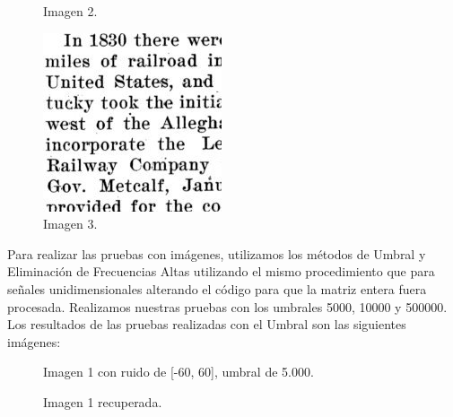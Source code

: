 \documentclass[10pt, a4paper]{article}
\begin{document}
\begin{itemize}
\begin{figure}[!htb]
  \caption{Imagen 2.}\label{fig:awesome_image2}
\endminipage\hfill
{}%
  \includegraphics[width=\linewidth]{imagen3.jpg}
  \caption{Imagen 3.}\label{fig:awesome_image3}
\endminipage
\end{figure}


Para realizar las pruebas con imágenes, utilizamos los métodos de Umbral y Eliminación de Frecuencias Altas utilizando el mismo procedimiento que para señales unidimensionales alterando el código para que la matriz entera fuera procesada.\newline
Realizamos nuestras pruebas con los umbrales 5000, 10000 y 500000.\newline
Los resultados de las pruebas realizadas con el Umbral son las siguientes imágenes:\newline

\begin{figure}[H] %
\hfill
\begin{minipage}[t]{.45\textwidth}
\begin{center}
\caption{Imagen 1 con ruido de [-60, 60], umbral de 5.000.}
\label{fig-tc1}
\end{center}
\end{minipage}
\hfill
\begin{minipage}[t]{.45\textwidth}
\begin{center}
\caption{Imagen 1 recuperada.}
\label{fig-tc2}
\end{center}
\end{minipage}
\hfill
\end{figure}



\end{itemize}
\end{document}
